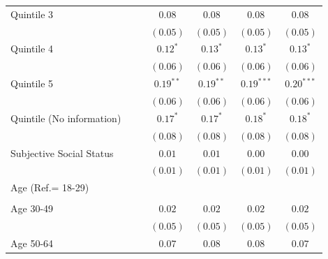 \documentclass[
  12pt,
  a4paper,
]{article}
\begin{document}
\begin{table}[!ht]
\begin{center}
{\begin{tabular}{l c c c c c c}
\quad Quintile 3                    &               &               & $0.08$        & $0.08$        & $0.08$        & $0.08$        \\
                                    &               &               & $(0.05)$      & $(0.05)$      & $(0.05)$      & $(0.05)$      \\
\quad Quintile 4                    &               &               & $0.12^{*}$    & $0.13^{*}$    & $0.13^{*}$    & $0.13^{*}$    \\
                                    &               &               & $(0.06)$      & $(0.06)$      & $(0.06)$      & $(0.06)$      \\
\quad Quintile 5                    &               &               & $0.19^{**}$   & $0.19^{**}$   & $0.19^{***}$  & $0.20^{***}$  \\
                                    &               &               & $(0.06)$      & $(0.06)$      & $(0.06)$      & $(0.06)$      \\
\quad Quintile (No information)     &               &               & $0.17^{*}$    & $0.17^{*}$    & $0.18^{*}$    & $0.18^{*}$    \\
                                    &               &               & $(0.08)$      & $(0.08)$      & $(0.08)$      & $(0.08)$      \\
Subjective Social Status            &               &               & $0.01$        & $0.01$        & $0.00$        & $0.00$        \\
                                    &               &               & $(0.01)$      & $(0.01)$      & $(0.01)$      & $(0.01)$      \\
Age (Ref.= 18-29)                   &               &               &               &               &               &               \\
                                    &               &               &               &               &               &               \\
\quad Age 30-49                     &               &               & $0.02$        & $0.02$        & $0.02$        & $0.02$        \\
                                    &               &               & $(0.05)$      & $(0.05)$      & $(0.05)$      & $(0.05)$      \\
\quad Age 50-64                     &               &               & $0.07$        & $0.08$        & $0.08$        & $0.07$        \\

\end{tabular}}
\end{center}
\end{table}
\end{document}
